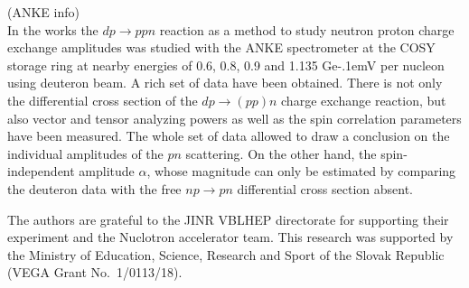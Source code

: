 \documentclass[twocolumn,epjc3]{svjour3}
\newcommand{\np}     {\ensuremath{np \rightarrow pn}\xspace}
\newcommand{\dpfrag} {\ensuremath{dp \rightarrow ppn}\xspace}
\newcommand{\dpchex} {\ensuremath{dp \rightarrow (pp)n}\xspace}
\newcommand{\GeV}    {Ge\kern-.1emV\xspace}
\begin{document}
\vspace{0.25cm}
\noindent (ANKE info)\\
In the works \cite{chi09,mch13} the \dpfrag reaction as a method to study
neutron proton charge exchange amplitudes was studied with the ANKE spectrometer
at the COSY storage ring at nearby energies of 0.6, 0.8, 0.9 and 1.135 \GeV per
nucleon using deuteron beam. A rich set of data have been obtained. There is not
only the differential cross section of the \dpchex charge exchange reaction, but
also vector and tensor analyzing powers as well as the spin correlation
parameters have been measured. The whole set of data allowed to draw a
conclusion on the individual amplitudes of the $pn$ scattering. On the other
hand, the spin-independent amplitude $\alpha$, whose magnitude can only be
estimated by comparing the deuteron data with the free \np differential cross
section absent.

\begin{acknowledgements}
  The authors are grateful to the JINR VBLHEP directorate for supporting their
  experiment and the Nuclotron accelerator team. This research was supported by
  the Ministry of Education, Science, Research and Sport of the Slovak Republic
  (VEGA Grant No.~1/0113/18).
\end{acknowledgements}
\end{document}
